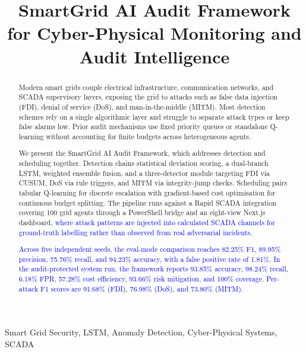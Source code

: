\documentclass[conference,a4paper]{IEEEtran}
\begin{document}
\pagestyle{empty}

\title{SmartGrid AI Audit Framework for Cyber-Physical Monitoring and Audit Intelligence}

\author{
}

\maketitle

\begin{abstract}
Modern smart grids couple electrical infrastructure, communication networks, and SCADA supervisory layers, exposing the grid to attacks such as false data injection (FDI), denial of service (DoS), and man-in-the-middle (MITM). Most detection schemes rely on a single algorithmic layer and struggle to separate attack types or keep false alarms low. Prior audit mechanisms use fixed priority queues or standalone Q-learning without accounting for finite budgets across heterogeneous agents.

We present the SmartGrid AI Audit Framework, which addresses detection and scheduling together. Detection chains statistical deviation scoring, a dual-branch LSTM, weighted ensemble fusion, and a three-detector module targeting FDI via CUSUM, DoS via rule triggers, and MITM via integrity-jump checks. Scheduling pairs tabular Q-learning for discrete escalation with gradient-based cost optimisation for continuous budget splitting. The pipeline runs against a Rapid SCADA integration covering 100 grid agents through a PowerShell bridge and an eight-view Next.js dashboard, \textcolor{blue}{where attack patterns are injected into calculated SCADA channels for ground-truth labelling rather than observed from real adversarial incidents}.

\textcolor{blue}{Across five independent seeds, the eval-mode comparison reaches 82.25\% F1, 89.95\% precision, 75.76\% recall, and 94.23\% accuracy, with a false positive rate of 1.81\%. In the audit-protected system run, the framework reports 93.85\% accuracy, 98.24\% recall, 6.18\% FPR, 57.28\% cost efficiency, 93.66\% risk mitigation, and 100\% coverage. Per-attack F1 scores are 91.68\% (FDI), 76.98\% (DoS), and 73.80\% (MITM).}
\end{abstract}

\begin{IEEEkeywords}
Smart Grid Security, LSTM, Anomaly Detection, Cyber-Physical Systems, SCADA
\end{IEEEkeywords}
\end{document}
